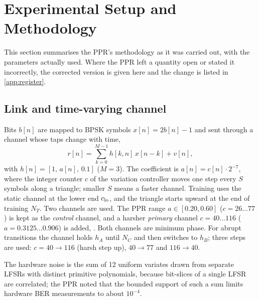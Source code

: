 \section{Experimental Setup and Methodology}
\label{sec:method}
This section summarises the PPR's methodology as it was carried out, with the parameters actually used. Where the PPR left a quantity open or stated it incorrectly, the corrected version is given here and the change is listed in \cref{app:register}.

\subsection{Link and time-varying channel}
\label{sec:channel}
Bits $b[n]$ are mapped to BPSK symbols $x[n]=2b[n]-1$ and sent through a channel whose taps change with time,
\begin{equation}
r[n]=\sum_{k=0}^{M-1} h[k,n]\,x[n-k]+v[n],
\label{eq:tv}
\end{equation}
with $h[n]=[1,\,a[n],\,0.1]$ ($M=3$). The coefficient is $a[n]=c[n]\cdot2^{-7}$, where the integer counter $c$ of the variation controller moves one step every $S$ symbols along a triangle; smaller $S$ means a faster channel. Training uses the static channel at the lower end $c_{\rm lo}$, and the triangle starts upward at the end of training $N_T$. Two channels are used. The PPR range $a\in[0.20,0.60]$ ($c=26\ldots77$) is kept as the \emph{control} channel, and a harsher \emph{primary} channel $c=40\ldots116$ ($a=0.3125\ldots0.906$) is added, . Both channels are minimum phase. For abrupt transitions the channel holds $h_A$ until $N_C$ and then switches to $h_B$; three steps are used: $c=40\to116$ (harsh step up), $40\to77$ and $116\to40$.


The hardware noise is the sum of 12 uniform variates drawn from separate LFSRs with distinct primitive polynomials, because bit-slices of a single LFSR are correlated; the PPR noted that the bounded support of such a sum limits hardware BER measurements to about $10^{-4}$. 

